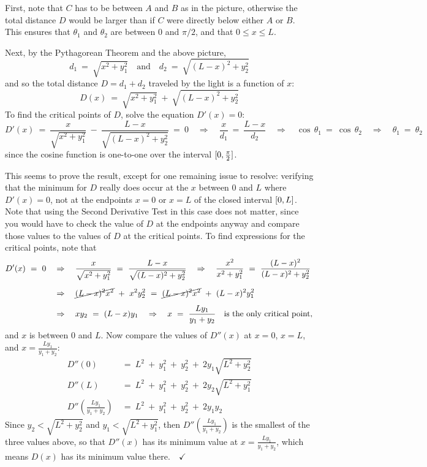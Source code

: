 \begin{exmp}
First, note that $C$ has to be between $A$ and $B$ as in the picture, otherwise
the total distance $D$ would be larger than if $C$ were directly below either
$A$ or $B$. This ensures that $\theta_1$ and $\theta_2$ are between $0$ and
$\pi/2$, and that $0 \le x \le L$.

Next, by the Pythagorean Theorem and the above picture,
\[
d_1 ~=~ \sqrt{x^2 + y_1^2} \quad\text{and}\quad
d_2 ~=~ \sqrt{(L-x)^2 + y_2^2}
\]
and so the total distance $D = d_1 + d_2$ traveled by the light is a function
of $x$:
\[
D(x) ~=~ \sqrt{x^2 + y_1^2} ~+~ \sqrt{(L-x)^2 + y_2^2}
\]
To find the critical points of $D$, solve the equation $D'(x)=0$:
\[
D'(x) ~=~ \frac{x}{\sqrt{x^2 + y_1^2}} ~-~ \frac{L-x}{\sqrt{(L-x)^2 + y_2^2}} ~=~ 0
\quad\Rightarrow\quad \frac{x}{d_1} ~=~ \frac{L-x}{d_2}
\quad\Rightarrow\quad \cos\,\theta_1 ~=~ \cos\,\theta_2
\quad\Rightarrow\quad \theta_1 ~=~ \theta_2
\]
since the cosine function is one-to-one over the interval $\lbrack 0,\frac{\pi}{2} \rbrack$.

This seems to prove the result, except for one remaining issue to resolve:
verifying that the minimum for $D$ really does occur at the $x$ between $0$ and
$L$ where $D'(x)=0$, not at the endpoints $x=0$ or $x=L$ of the closed interval
$\lbrack 0,L \rbrack$. Note that using the Second Derivative Test in this case does not
matter, since you would have to check the value of $D$ at the endpoints anyway
and compare those values to the values of $D$ at the critical points. To find
expressions for the critical points, note that
\begin{align*}
D'(x) ~=~ 0 \quad&\Rightarrow\quad
\frac{x}{\sqrt{x^2 + y_1^2}} ~=~ \frac{L-x}{\sqrt{(L-x)^2 + y_2^2}}
\quad\Rightarrow\quad \frac{x^2}{x^2 + y_1^2} ~=~ \frac{(L-x)^2}{(L-x)^2 + y_2^2}\\[6pt]
&\Rightarrow\quad \cancel{(L-x)^2 x^2} ~+~ x^2 y_2^2 ~=~ \cancel{(L-x)^2 x^2} ~+~ (L-x)^2 y_1^2\\[4pt]
&\Rightarrow\quad xy_2 ~=~ (L-x)y_1
\quad\Rightarrow\quad x ~=~ \frac{Ly_1}{y_1 + y_2} \quad\text{is the only critical point,}
\end{align*}
and $x$ is between $0$ and $L$. Now compare the values
of $D''(x)$ at $x=0$, $x=L$, and $x=\frac{Ly_1}{y_1 + y_2}$:
\begin{align*}
D''(0) ~&=~ L^2 ~+~ y_1^2 ~+~ y_2^2 ~+~ 2y_1\sqrt{L^2 + y_2^2}\\
D''(L) ~&=~ L^2 ~+~ y_1^2 ~+~ y_2^2 ~+~ 2y_2\sqrt{L^2 + y_1^2}\\
D''\left(\tfrac{Ly_1}{y_1 + y_2}\right) ~&=~ L^2 ~+~ y_1^2 ~+~ y_2^2 ~+~ 2y_1y_2
\end{align*}
Since $y_2 < \sqrt{L^2 + y_2^2}$ and $y_1 < \sqrt{L^2 + y_1^2}$, then
$D''\left(\tfrac{Ly_1}{y_1 + y_2}\right)$ is the smallest of the three values
above, so that $D''(x)$ has its minimum value at $x=\frac{Ly_1}{y_1 + y_2}$,
which means $D(x)$ has its minimum value there.$\quad\checkmark$
\end{exmp}
